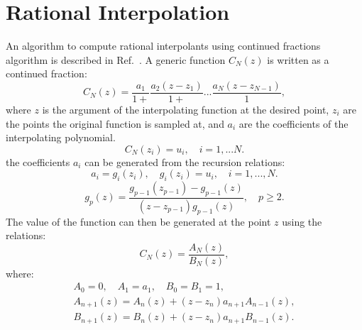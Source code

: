 \section{Rational Interpolation}
\label{app:ratint}
An algorithm to compute rational interpolants 
using continued fractions algorithm is described in Ref.~\cite{vidbergserene77}.
A generic function $C_N(z)$ is written as a continued fraction:
%
\begin{equation}
C_{N}(z) = \frac{a_{1}}{1+}\frac{a_{2}(z-z_{1})}{1+}...\frac{a_{N}(z-z_{N-1})}{1},
\end{equation}
%
where $z$ is the argument of the interpolating function
at the desired point, $z_{i}$ are the points the original function is sampled at,
and $a_{i}$ are the coefficients of the interpolating polynomial.
%
\begin{equation}
C_{N}(z_{i}) = u_{i}, \quad i=1,...N.
\end{equation}
%
the coefficients $a_{i}$ can be generated from the recursion relations:
%
\begin{equation}
a_{i} = g_{i}(z_{i}),\quad g_{i}(z_{i})=u_{i},\quad i=1,...,N.
\end{equation}
%
\begin{equation}
g_{p}(z) = \frac{g_{p-1}(z_{p-1}) - g_{p-1}(z)}{(z - z_{p-1})g_{p-1}(z)}, \quad p \geq 2.
\end{equation}
%
The value of the function can then be generated at the point $z$ using the relations:
%
\begin{equation}
C_{N}(z) = \frac{A_{N}(z)}{B_{N}(z)},
\end{equation}
%
where:
%
\begin{eqnarray}
A_{0}=0, \quad A_{1} = a_{1}, \quad B_{0}=B_{1}=1, \nonumber \\
A_{n+1}(z) = A_{n}(z) + (z-z_{n})a_{n+1}A_{n-1}(z), \nonumber \\
B_{n+1}(z) = B_{n}(z) + (z-z_{n})a_{n+1}B_{n-1}(z).
\end{eqnarray}



